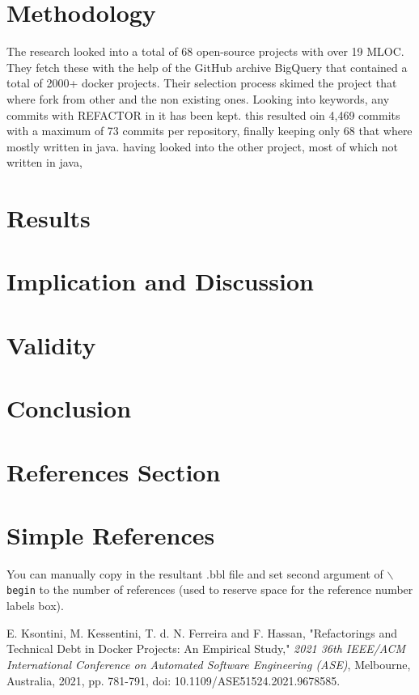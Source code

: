 \documentclass[lettersize,journal]{IEEEtran}
\begin{document}
\section{Methodology}

The research looked into a total of 68 open-source projects with over 19 MLOC. 
They fetch these with the help of the GitHub archive BigQuery that contained a total of 2000+ docker projects.
Their selection process skimed the project that where fork from other and the non existing ones.
Looking into keywords, any commits with REFACTOR in it has been kept.
this resulted oin 4,469 commits with a maximum of 73 commits per repository, finally keeping only 68 that where mostly written in java.
having looked into the other project, most of which not written in java, 

\section{Results}

\section{Implication and Discussion}

\section{Validity}

\section{Conclusion}

\section{References Section}
%
\section{Simple References}
You can manually copy in the resultant .bbl file and set second argument of $\backslash${\tt{begin}} to the number of references
 (used to reserve space for the reference number labels box).

\begin{thebibliography}{1}


E. Ksontini, M. Kessentini, T. d. N. Ferreira and F. Hassan, "Refactorings and Technical Debt in Docker Projects: An Empirical Study," \textit{2021 36th IEEE/ACM International Conference on Automated Software Engineering (ASE)}, Melbourne, Australia, 2021, pp. 781-791, doi: 10.1109/ASE51524.2021.9678585.

\end{thebibliography}

\vfill
\end{document}
